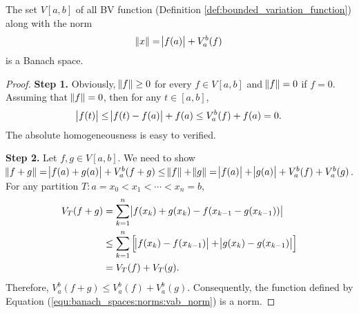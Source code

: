 \begin{example}
The set $V[a, b]$ of all BV function (Definition 
\ref{def:bounded_variation_function}) along with the norm 
\begin{equation}
    \label{equ:banach_spaces:norms:vab_norm}
    \norm{x} = \abs{f(a)} + V_a^b(f)
\end{equation}
is a Banach space. 
\end{example}
\begin{proof}
\textbf{Step 1. }
Obviously, $\norm{f} \ge 0$ for every $f \in V[a, b]$ and $\norm{f} = 0$ 
if $f = 0$. Assuming that $\norm{f} = 0$, then for any $t \in [a, b]$, 
\begin{equation*}
    \abs{f(t)} \le \abs{f(t) - f(a)} + f(a) \le V_a^b(f) + f(a) = 0. 
\end{equation*}
The absolute homogeneousness is easy to verified. 

\textbf{Step 2. }
Let $f, g \in V[a, b]$. We need to show $\norm{f + g} = \abs{f(a) + g(a)} 
+ V_a^b(f + g) \le \norm{f} + \norm{g} = \abs{f(a)} + \abs{g(a)} + 
V_a^b(f) + V_a^b(g)$.
For any partition $T: a = x_0 < x_1 < \cdots < x_n = b$, 
\begin{equation*}
    \begin{aligned}
        V_T(f + g) &= \sum_{k = 1}^{n} 
            \abs{f(x_k) + g(x_k) - f(x_{k-1} - g(x_{k-1}))} \\
        &\le \sum_{k=1}^{n} \left[ \abs{f(x_k) - f(x_{k-1})} 
            + \abs{g(x_k) - g(x_{k-1})} \right] \\
        &= V_T(f) + V_T(g). 
    \end{aligned}
\end{equation*}
Therefore, $V_a^b(f + g) \le V_a^b(f) + V_a^b(g)$. 
Consequently, the function defined by Equation 
(\ref{equ:banach_spaces:norms:vab_norm}) is a norm. 


\end{proof}
